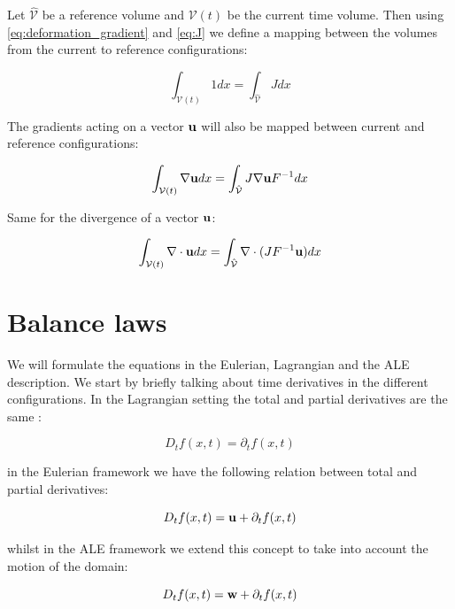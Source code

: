 Let $\hat{\mathcal{V}}$ be a reference volume and $\mathcal{V}(t)$ be the current time volume. Then using \eqref{eq:deformation_gradient} and \eqref{eq:J} we define a mapping between the volumes from the current to reference configurations:

\begin{equation}
 \int_{\mathcal{V}(t)} 1  dx = \int_{\hat{\mathcal{V}}} J dx  
\end{equation}

The gradients acting on a vector $ \bold{u} $ will also be mapped between current and reference configurations:

\begin{equation}
\int_{\mathcal{V}(t)} \nabla \bold{u}   dx = \int_{\hat{\mathcal{V}}} J  \nabla \bold{u}F^{-1} dx  
\end{equation}

Same for the divergence of a vector $ \bold{u}$:

\begin{equation}
\int_{\mathcal{V}(t)} \nabla \cdot \bold{u}   dx = \int_{\hat{\mathcal{V}}} \nabla \cdot( J  F^{-1} \bold{u}) dx  
\end{equation}

\section{Balance laws}

We will formulate the equations in the Eulerian, Lagrangian and the ALE description. We start by briefly talking about time derivatives in the different configurations. In the Lagrangian setting the total and partial derivatives are the same \cite{Wick2011}:

\begin{equation}
D_t f(x,t) = \partial_t f(x,t)
\end{equation}

in the Eulerian framework we have the following relation between total and partial derivatives:

\begin{equation}
D_t f(x,t) = \bold{u} + \partial_t f(x,t)
\end{equation}

whilst in the ALE framework we extend this concept to take into account the motion of the domain:

\begin{equation}
D_t f(x,t) = \bold{w} + \partial_t f(x,t)
\end{equation}

